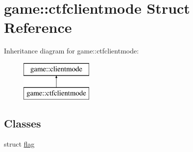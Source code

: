 \hypertarget{structgame_1_1ctfclientmode}{}\section{game\+:\+:ctfclientmode Struct Reference}
\label{structgame_1_1ctfclientmode}
Inheritance diagram for game\+:\+:ctfclientmode\+:\begin{figure}[H]
\begin{center}
\leavevmode
\includegraphics[height=2.000000cm]{structgame_1_1ctfclientmode}
\end{center}
\end{figure}
\subsection*{Classes}
\begin{DoxyCompactItemize}
\item 
struct \hyperlink{structgame_1_1ctfclientmode_1_1flag}{flag}
\end{DoxyCompactItemize}
